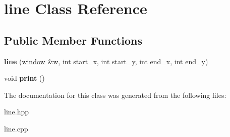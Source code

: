 \hypertarget{classline}{}\section{line Class Reference}
\label{classline}
\subsection*{Public Member Functions}
\begin{DoxyCompactItemize}
\item 
{\bfseries line} (\hyperlink{classwindow}{window} \&w, int start\+\_\+x, int start\+\_\+y, int end\+\_\+x, int end\+\_\+y)\hypertarget{classline_a7f904d40532d34c424e65ccb27a35fe6}{}\label{classline_a7f904d40532d34c424e65ccb27a35fe6}

\item 
void {\bfseries print} ()\hypertarget{classline_a898f0c4e20bb93b2738613457530906f}{}\label{classline_a898f0c4e20bb93b2738613457530906f}

\end{DoxyCompactItemize}


The documentation for this class was generated from the following files\+:\begin{DoxyCompactItemize}
\item 
line.\+hpp\item 
line.\+cpp\end{DoxyCompactItemize}
